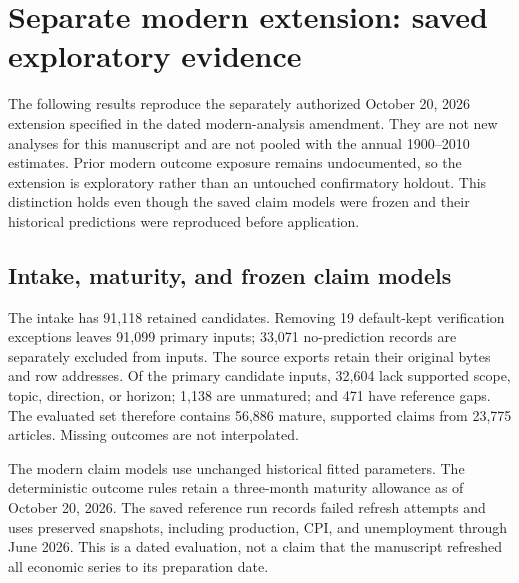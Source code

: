 \section{Separate modern extension: saved exploratory evidence}\label{app:modern}
The following results reproduce the separately authorized October 20, 2026 extension specified in the dated modern-analysis amendment. They are not new analyses for this manuscript and are not pooled with the annual 1900--2010 estimates. Prior modern outcome exposure remains undocumented, so the extension is exploratory rather than an untouched confirmatory holdout. This distinction holds even though the saved claim models were frozen and their historical predictions were reproduced before application.

\subsection{Intake, maturity, and frozen claim models}
The intake has 91,118 retained candidates. Removing 19 default-kept verification exceptions leaves 91,099 primary inputs; 33,071 no-prediction records are separately excluded from inputs. The source exports retain their original bytes and row addresses. Of the primary candidate inputs, 32,604 lack supported scope, topic, direction, or horizon; 1,138 are unmatured; and 471 have reference gaps. The evaluated set therefore contains 56,886 mature, supported claims from 23,775 articles. Missing outcomes are not interpolated.

The modern claim models use unchanged historical fitted parameters. The deterministic outcome rules retain a three-month maturity allowance as of October 20, 2026. The saved reference run records failed refresh attempts and uses preserved snapshots, including production, CPI, and unemployment through June 2026. This is a dated evaluation, not a claim that the manuscript refreshed all economic series to its preparation date.


